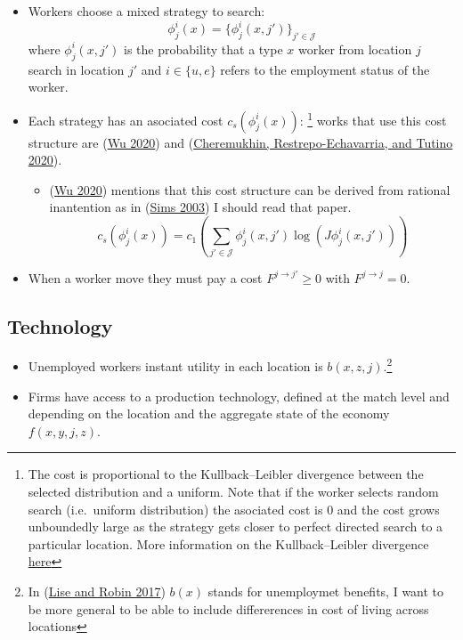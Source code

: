 \documentclass[
  letterpaper,
  DIV=11,
  numbers=noendperiod]{scrreprt}
\providecommand{\tightlist}{%
  \setlength{\itemsep}{0pt}\setlength{\parskip}{0pt}}\usepackage{longtable,booktabs,array}
\begin{document}
\begin{itemize}
  \begin{itemize}
  \tightlist
  \item
    Workers choose a mixed strategy to search: \[
    \phi^i_j(x) = \{\phi^i_j(x, j')\}_{j'\in \mathcal{J}}
    \] where \(\phi^i_j(x, j')\) is the probability that a type \(x\)
    worker from location \(j\) search in location \(j'\) and
    \(i\in \{u,e\}\) refers to the employment status of the worker.
  \item
    Each strategy has an asociated cost \(c_s(\phi^i_j(x))\):
    \footnote{The cost is proportional to the Kullback--Leibler
      divergence between the selected distribution and a uniform. Note
      that if the worker selects random search (i.e.~uniform
      distribution) the asociated cost is \(0\) and the cost grows
      unboundedly large as the strategy gets closer to perfect directed
      search to a particular location. More information on the
      Kullback--Leibler divergence
      \href{https://en.wikipedia.org/wiki/Kullback\%E2\%80\%93Leibler_divergence}{here}}
    works that use this cost structure are
    (\protect\hyperlink{ref-wuPartiallyDirectedSearch2020}{Wu 2020}) and
    (\protect\hyperlink{ref-cheremukhinTargetedSearchMatching2020}{Cheremukhin,
    Restrepo-Echavarria, and Tutino 2020}).

    \begin{itemize}
    \tightlist
    \item
      (\protect\hyperlink{ref-wuPartiallyDirectedSearch2020}{Wu 2020})
      mentions that this cost structure can be derived from rational
      inantention as in
      (\protect\hyperlink{ref-simsImplicationsRationalInattention2003}{Sims
      2003}) I should read that paper. \[
      c_s(\phi^i_j(x)) = c_1 \left(\sum_{j'\in \mathcal{J}}\phi^i_j(x, j')\log{(J\phi^i_j(x, j'))}\right)
      \]
    \end{itemize}
  \item
    When a worker move they must pay a cost \(F^{j \to j'}\geq 0\) with
    \(F^{j\to j} = 0\).
  \end{itemize}
\end{itemize}

\hypertarget{technology}{%
\subsection{Technology}\label{technology}}

\begin{itemize}
\tightlist
\item
  Unemployed workers instant utility in each location is
  \(b(x,z,j)\).\footnote{In
    (\protect\hyperlink{ref-liseMacrodynamicsSortingWorkers2017}{Lise
    and Robin 2017}) \(b(x)\) stands for unemploymet benefits, I want to
    be more general to be able to include differerences in cost of
    living across locations}
\item
  Firms have access to a production technology, defined at the match
  level and depending on the location and the aggregate state of the
  economy \(f(x, y, j, z)\).
\end{itemize}
\end{document}
